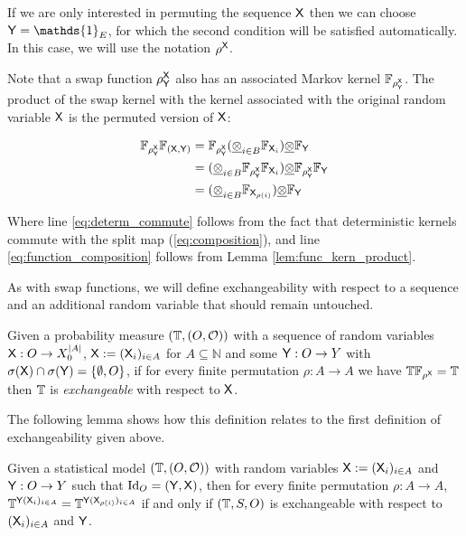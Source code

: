 If we are only interested in permuting the sequence $\mathsf{X}$ then we can choose $\RV{Y}=\mathds{1}_E$, for which the second condition will be satisfied automatically. In this case, we will use the notation $\rho^{\mathsf{X}}$.

Note that a swap function $\rho^{\mathsf{X}}_{\mathsf{Y}}$ also has an associated Markov kernel $\mathbb{F}_{\rho^{\mathsf{X}}_{\mathsf{Y}}}$. The product of the swap kernel with the kernel associated with the original random variable $\mathsf{X}$ is the permuted version of $\mathsf{X}$:

\begin{align}
    \mathbb{F}_{\rho^{\mathsf{X}}_{\mathsf{Y}}} \mathbb{F}_{(\mathsf{X},\mathsf{Y})} &= \mathbb{F}_{\rho^{\mathsf{X}}_{\mathsf{Y}}} (\underline{\otimes}_{i\in B} \mathbb{F}_{\mathsf{X}_i})\underline{\otimes} \mathbb{F}_{\mathsf{Y}} \\
    &= (\underline{\otimes}_{i\in B} \mathbb{F}_{\rho^{\mathsf{X}}_{\mathsf{Y}}} \mathbb{F}_{\mathsf{X}_{i}})\underline{\otimes} \mathbb{F}_{\rho^{\mathsf{X}}_{\mathsf{Y}}} \mathbb{F}_{\mathsf{Y}} \label{eq:determ_commute}\\
                                               &= (\underline{\otimes}_{i\in B} \mathbb{F}_{\mathsf{X}_{\rho(i)}})\underline{\otimes} \mathbb{F}_{\mathsf{Y}}\label{eq:function_composition}
\end{align}

Where line \ref{eq:determ_commute} follows from the fact that deterministic kernels commute with the split map (\ref{eq:composition}), and line \ref{eq:function_composition} follows from Lemma \ref{lem:func_kern_product}.

As with swap functions, we will define exchangeability with respect to a sequence and an additional random variable that should remain untouched.

\begin{definition}[Exchangeability]\label{def:exchangeability}
Given a probability measure $(\mathbb{T},(O,\mathcal{O}))$ with a sequence of random variables $\mathsf{X}:O\to X_0^{|A|}$, $\mathsf{X}:=(\mathsf{X}_i)_{i\in A}$ for $A\subseteq \mathbb{N}$ and some $\mathsf{Y}:O\to Y$ with $\sigma(\mathsf{X})\cap\sigma(\mathsf{Y})=\{\emptyset,O\}$, if for every finite permutation $\rho:A\to A$ we have $\mathbb{T}\mathbb{F}_{\rho^{\mathsf{X}}}=\mathbb{T}$ then $\mathbb{T}$ is \emph{exchangeable} with respect to $\mathsf{X}$.
\end{definition}

The following lemma shows how this definition relates to the first definition of exchangeability given above.

\begin{lemma}
Given a statistical model $(\mathbb{T},(O,\mathcal{O}))$ with random variables $\mathsf{X}:=(\mathsf{X}_i)_{i\in A}$ and $\mathsf{Y}:O\to Y$ such that $\mathrm{Id}_O = (\mathsf{Y},\mathsf{X})$, then for every finite permutation $\rho:A\to A$, $\mathbb{T}^{\mathsf{Y}(\mathsf{X}_{i})_{i\in A}}=\mathbb{T}^{\mathsf{Y}(\mathsf{X}_{\rho(i)})_{i\in A}}$ if and only if $(\mathbb{T},S,O)$ is exchangeable with respect to $(\mathsf{X}_i)_{i\in A}$ and $\mathsf{Y}$.
\end{lemma}

